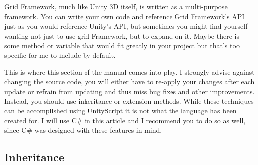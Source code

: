 Grid Framework, much like Unity 3\+D itself, is written as a multi-\/purpose framework. You can write your own code and reference Grid Framework's A\+P\+I just as you would reference Unity's A\+P\+I, but sometimes you might find yourself wanting not just to use grid Framework, but to expand on it. Maybe there is some method or variable that would fit greatly in your project but that's too specific for me to include by default.

This is where this section of the manual comes into play. I strongly advise against changing the source code, you will either have to re-\/apply your changes after each update or refrain from updating and thus miss bug fixes and other improvements. Instead, you should use inheritance or extension methods. While these techniques can be accomplished using Unity\+Script it is not what the language has been created for. I will use C\# in this article and I recommend you to do so as well, since C\# was designed with these features in mind.

\subsection*{Inheritance }

